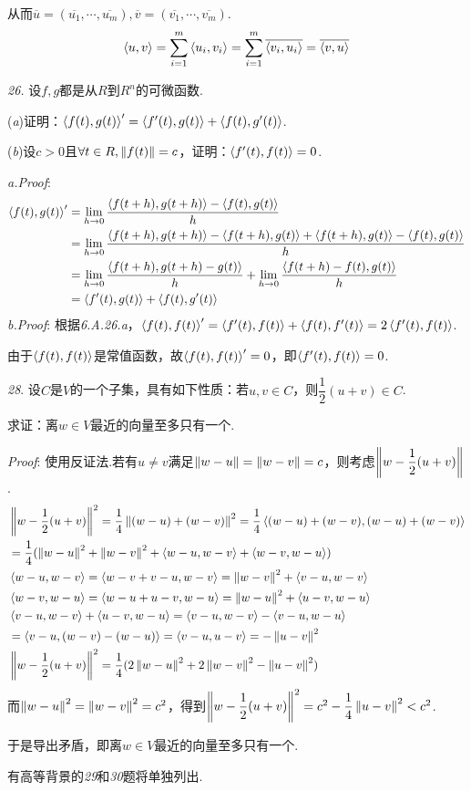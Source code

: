从而\(\overline{u}=(\overline{u_1},\cdots,\overline{u_m}),\overline{v}=(\overline{v_1},\cdots,\overline{v_m})\).
    \begin{align*}
        \ip{u}{v}=\sum_{i=1}^m \ip{u_i}{v_i}=\sum_{i=1}^m \overline{\ip{v_i}{u_i}}=\overline{\ip{v}{u}}
    \end{align*}

\newpage

\textit{26.}
设\(f,g\)都是从\(R\)到\(R^n\)的可微函数.

(\textit{a})证明：\(\ip{f(t)}{g(t)}'=\ip{f'(t)}{g(t)}+\ip{f(t)}{g'(t)}\).

(\textit{b})设\(c>0\)且\(\forall t \in R,\norm{f(t)}=c\)，证明：\(\ip{f'(t)}{f(t)}=0\).

\textit{a.Proof}:
    \begin{align*}
        \ip{f(t)}{g(t)}'&=\lim_{h \rightarrow 0}\dfrac{\ip{f(t+h)}{g(t+h)}-\ip{f(t)}{g(t)}}{h} \\
        &=\lim_{h \rightarrow 0}\dfrac{\ip{f(t+h)}{g(t+h)}-\ip{f(t+h)}{g(t)}+\ip{f(t+h)}{g(t)}-\ip{f(t)}{g(t)}}{h} \\
        &=\lim_{h \rightarrow 0}\dfrac{\ip{f(t+h)}{g(t+h)-g(t)}}{h}+\lim_{h \rightarrow 0}\dfrac{\ip{f(t+h)-f(t)}{g(t)}}{h} \\
        &=\ip{f'(t)}{g(t)}+\ip{f(t)}{g'(t)}
    \end{align*}
\textit{b.Proof}:
根据\textit{6.A.26.a}，\(\ip{f(t)}{f(t)}'=\ip{f'(t)}{f(t)}+\ip{f(t)}{f'(t)}=2\ip{f'(t)}{f(t)}\).

由于\(\ip{f(t)}{f(t)}\)是常值函数，故\(\ip{f(t)}{f(t)}'=0\)，即\(\ip{f'(t)}{f(t)}=0\).

\hspace*{\fill}

\textit{28}.
设\(C\)是\(V\)的一个子集，具有如下性质：若\(u,v \in C\)，则\(\dfrac{1}{2}(u+v) \in C\).

求证：离\(w \in V\)最近的向量至多只有一个.

\textit{Proof}:
使用反证法.若有\(u \ne v\)满足\(\norm{w-u}=\norm{w-v}=c\)，则考虑\(\norm{w-\dfrac{1}{2}(u+v)}\).
    \begin{align*}
        &\norm{w-\dfrac{1}{2}(u+v)}^2=\dfrac{1}{4}\norm{(w-u)+(w-v)}^2=\dfrac{1}{4}\ip{(w-u)+(w-v)}{(w-u)+(w-v)} \\
        &=\dfrac{1}{4}(\norm{w-u}^2+\norm{w-v}^2+\ip{w-u}{w-v}+\ip{w-v}{w-u}) \\
        &\ip{w-u}{w-v}=\ip{w-v+v-u}{w-v}=\norm{w-v}^2+\ip{v-u}{w-v} \\
        &\ip{w-v}{w-u}=\ip{w-u+u-v}{w-u}=\norm{w-u}^2+\ip{u-v}{w-u} \\
        &\ip{v-u}{w-v}+\ip{u-v}{w-u}=\ip{v-u}{w-v}-\ip{v-u}{w-u} \\
        &=\ip{v-u}{(w-v)-(w-u)}=\ip{v-u}{u-v}=-\norm{u-v}^2 \\
        &\norm{w-\dfrac{1}{2}(u+v)}^2=\dfrac{1}{4}(2\norm{w-u}^2+2\norm{w-v}^2-\norm{u-v}^2)
    \end{align*}
而\(\norm{w-u}^2=\norm{w-v}^2=c^2\)，得到\(\norm{w-\dfrac{1}{2}(u+v)}^2=c^2-\dfrac{1}{4}\norm{u-v}^2<c^2\).

于是导出矛盾，即离\(w \in V\)最近的向量至多只有一个.

有高等背景的\textit{29}和\textit{30}题将单独列出.

